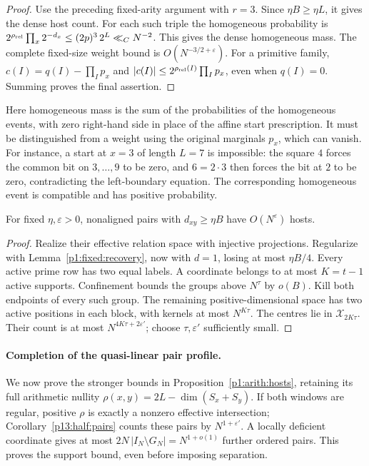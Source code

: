 \begin{proof}
Use the preceding fixed-arity argument with $r=3$.
Since $\eta B\ge\eta L$, it gives the dense host count.
For each such triple the homogeneous probability is
$2^{\rho_{\rm rel}}\prod_x2^{-d_x}\le(2p)^3\,2^L\ll_C N^{-2}$.
This gives the dense homogeneous mass.
The complete fixed-size weight bound is $O(N^{-3/2+\varepsilon})$.
For a primitive family, $c(I)=q(I)-\prod_Ip_x$ and
$|c(I)|\le2^{\rho_{\rm rel}(I)}\prod_Ip_x$, even when $q(I)=0$.
Summing proves the final assertion.
\end{proof}

Here homogeneous mass is the sum of the probabilities of the
homogeneous events, with zero right-hand side in place of the affine
start prescription.
It must be distinguished from a weight using the original marginals
$p_x$, which can vanish. For instance, a start at $x=3$ of length
$L=7$ is impossible: the square $4$ forces the common bit on
$3,\ldots,9$ to be zero, and $6=2\cdot3$ then forces the bit at $2$
to be zero, contradicting the left-boundary equation. The corresponding
homogeneous event is compatible and has positive probability.

\begin{corollary}
\label{p13:conf:dense-pairs}
For fixed \(\eta,\varepsilon>0\), nonaligned pairs
with \(d_{xy}\ge\eta B\) have \(O(N^\varepsilon)\)
hosts.
\end{corollary}

\begin{proof}
Realize their effective relation space with injective
projections. Regularize with
Lemma~\ref{p1:fixed:recovery}, now with \(d=1\),
losing at most \(\eta B/4\).
Every active prime row has two equal labels.
A coordinate belongs to at most \(K=t-1\) active supports.
Confinement bounds the groups above \(N^\tau\) by \(o(B)\).
Kill both endpoints of every such group.
The remaining positive-dimensional space has two active
positions in each block, with kernels at most \(N^{K\tau}\).
The centres lie in \(\mathcal X_{2K\tau}\).
Their count is at most \(N^{4K\tau+2\varepsilon'}\);
choose \(\tau,\varepsilon'\) sufficiently small.
\end{proof}


\paragraph{Completion of the quasi-linear pair profile.}
\label{p18:conf:pair-profile}
We now prove the stronger bounds in Proposition~\ref{p1:arith:hosts},
retaining its full arithmetic nullity
$\rho(x,y)=2L-\dim(S_x+S_y)$.
If both windows are regular, positive $\rho$ is exactly a nonzero
effective intersection; Corollary~\ref{p13:half:pairs} counts these
pairs by $N^{1+\varepsilon'}$. A locally deficient coordinate gives
at most $2N\,|I_N\setminus G_N|=N^{1+o(1)}$ further ordered pairs.
This proves the support bound, even before imposing separation.

